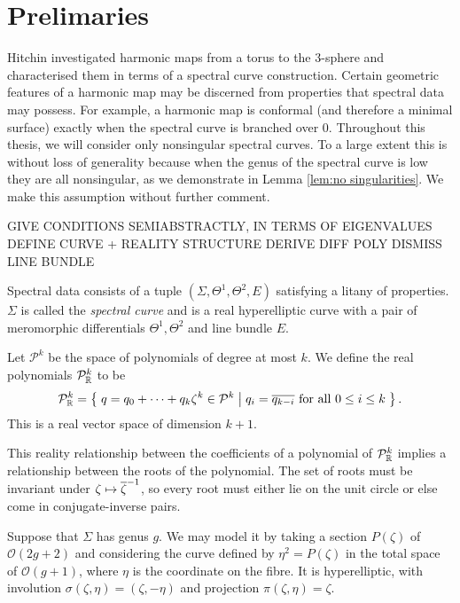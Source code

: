 \documentclass{article}
\begin{document}
\section{Prelimaries}
Hitchin \cite{Hitchin1990} investigated harmonic maps from a torus to the $3$-sphere and characterised them in terms of a spectral curve construction. Certain geometric features of a harmonic map may be discerned from properties that spectral data may possess. For example, a harmonic map is conformal (and therefore a minimal surface) exactly when the spectral curve is branched over $0$. Throughout this thesis, we will consider only nonsingular spectral curves. To a large extent this is without loss of generality because when the genus of the spectral curve is low they are all nonsingular, as we demonstrate in Lemma \ref{lem:no singularities}. We make this assumption without further comment.

\todo{}
GIVE CONDITIONS SEMIABSTRACTLY, IN TERMS OF EIGENVALUES
DEFINE CURVE + REALITY STRUCTURE
DERIVE DIFF POLY
DISMISS LINE BUNDLE

Spectral data consists of a tuple $(\Sigma, \Theta^1, \Theta^2, E)$ satisfying a litany of properties. $\Sigma$ is called the \emph{spectral curve} and is a real hyperelliptic curve with a pair of meromorphic differentials $\Theta^1,\Theta^2$ and line bundle $E$.

\begin{defn}
\label{def:mathcal P}
Let $\mathcal{P}^k$ be the space of polynomials of degree at most $k$. We define the real polynomials $\mathcal{P}^k_{\mathbb{R}}$ to be
\[
\mathcal{P}^k_{\mathbb{R}}
= \left\{\;  q = q_0 + \dots + q_k \zeta^k \in \mathcal{P}^k  \;\middle|\;  q_i = \overline{q_{k-i}} \text{ for all } 0 \leq i \leq k \;\right\}.
\]
This is a real vector space of dimension $k+1$.
\end{defn}

This reality relationship between the coefficients of a polynomial of $\mathcal{P}^k_{\mathbb{R}}$ implies a relationship between the roots of the polynomial. The set of roots must be invariant under $\zeta\mapsto \overline{\zeta}^{-1}$, so every root must either lie on the unit circle or else come in conjugate-inverse pairs.

Suppose that $\Sigma$ has genus $g$. We may model it by taking a section $P(\zeta)$ of $\mathcal{O}(2g+2)$ and considering the curve defined by $\eta^2 = P(\zeta)$ in the total space of $\mathcal{O}(g+1)$, where $\eta$ is the coordinate on the fibre. It is hyperelliptic, with involution $\sigma(\zeta,\eta) = (\zeta,-\eta)$ and projection $\pi(\zeta,\eta) = \zeta$.
\end{document}

